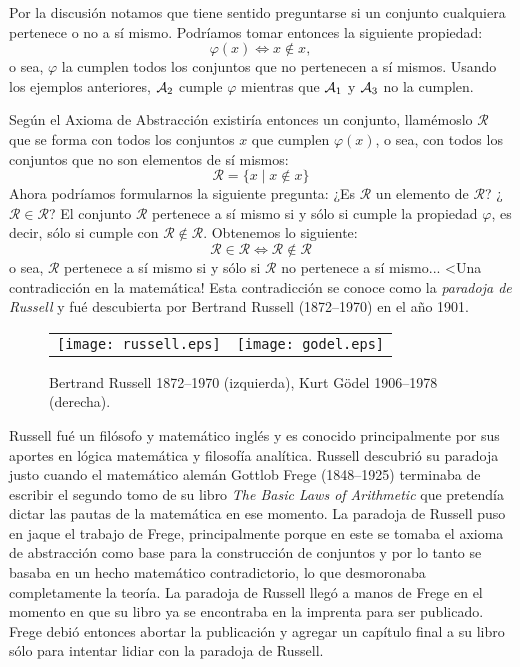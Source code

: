 Por la discusión notamos que tiene sentido preguntarse si un conjunto cualquiera pertenece o no a sí mismo.
Podríamos tomar entonces la siguiente propiedad:
\[
\varphi(x)\Leftrightarrow x\notin x,
\]
o sea, $\varphi$ la cumplen todos los conjuntos que no pertenecen a sí mismos.
Usando los ejemplos anteriores, $\mathcal{A}_2$ cumple $\varphi$ mientras que $\mathcal{A}_1$ y $\mathcal{A}_3$ no la cumplen. 

Según el Axioma de Abstracción existiría entonces un conjunto, llamémoslo $\mathcal{R}$ que se forma con todos los conjuntos $x$ que cumplen $\varphi(x)$, o sea, con todos los conjuntos que no son elementos de sí mismos:
\[
\mathcal{R}=\{x\;|\;x\notin x\}
\]
Ahora podríamos formularnos la siguiente pregunta:
¿Es $\mathcal{R}$ un elemento de $\mathcal{R}$? ¿$\mathcal{R}\in\mathcal{R}$?
El conjunto $\mathcal{R}$ pertenece a sí mismo si y sólo si cumple la propiedad $\varphi$, es decir, sólo si cumple con $\mathcal{R}\notin\mathcal{R}$.
Obtenemos lo siguiente:
\[
\mathcal{R}\in\mathcal{R}\Leftrightarrow\mathcal{R}\notin\mathcal{R}
\]
o sea, $\mathcal{R}$ pertenece a sí mismo si y sólo si $\mathcal{R}$ no pertenece a sí mismo... <Una contradicción en la matemática!
Esta contradicción se conoce como la \emph{paradoja de Russell} y fué descubierta por Bertrand Russell (1872--1970) en el año 1901.

\begin{nota}

\begin{figure}[h!]
	\begin{center}
	\begin{tabular}{cc}
	\texttt{[image: russell.eps]} \hspace*{30pt} &
	\hspace*{30pt} \texttt{[image: godel.eps]}
	\end{tabular}
	\end{center}
	\caption[]{Bertrand Russell 1872--1970 (izquierda), Kurt G\"odel 1906--1978 (derecha).}
\end{figure}

Russell fué un filósofo y matemático inglés y es conocido principalmente por sus aportes en lógica matemática y filosofía analítica.
Russell descubrió su paradoja justo cuando el matemático alemán Gottlob Frege (1848--1925) terminaba de escribir el segundo tomo de su libro \emph{The Basic Laws of Arithmetic} que pretendía dictar las pautas de la matemática en ese momento.
La paradoja de Russell puso en jaque el trabajo de Frege, principalmente porque en este se tomaba el axioma de abstracción como base para la construcción de conjuntos y por lo tanto se basaba en un hecho matemático contradictorio, lo que desmoronaba completamente la teoría.
La paradoja de Russell llegó a manos de Frege en el momento en que su libro ya se encontraba en la imprenta para ser publicado.
Frege debió entonces abortar la publicación y agregar un capítulo final a su libro sólo para intentar lidiar con la paradoja de Russell.
\end{nota}

